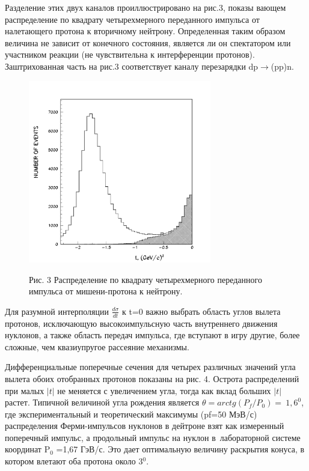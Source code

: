 \documentclass[a4paper,12pt]{article}
\begin{document}
{{        \vspace {10mm}
        Разделение этих двух каналов проиллюстрировано на рис.3, показы\-
        вающем распределение по квадрату четырехмерного переданного
        импуль\-са от налетающего протона к вторичному нейтрону.
        Определенная таким образом величина не зависит от конечного
        состояния, является ли он спектатором или участником реакции
        (не чувствительна к интерференции протонов). Заштрихованная часть
        на рис.3 соответствует каналу переза\-рядки dp$\to$(pp)n.

        \begin{figure}[hbt]
          \begin{center}
            \includegraphics[width=8cm]{dist.pdf}
          \end{center}
          \vspace{0.4mm}
          Рис. 3 Распределение по квадрату четырехмерного переданного
          импульса от мишени-протона к нейтрону.
        \end{figure}

        Для разумной интерполяции $\frac{d\sigma}{dt}$ к t=0
        важно выбрать область углов вылета протонов,
        исключающую высокоимпульсную часть внутреннего
        движения нуклонов, а также область передач импульса, где вступают
        в игру другие, более сложные, чем квазиупругое рассеяние механизмы.

        Дифференциальные поперечные сечения для четырех различных
        значе\-ний угла вылета обоих отобранных протонов показаны
        на рис. 4. Острота распределений при малых $\vert t\vert$
        не меняется с увеличением угла, тогда как вклад больших
        $\vert t\vert$ растет. Типичной величиной угла рождения является
        $\theta=arctg(P_f/P_0)=~1,6^0$, где экспериментальный
        и теоретический максимумы (pf=50 МэВ/с) распределения
        Ферми-импульсов нуклонов в дейтроне взят как измеренный поперечный
        импульс, а продольный импульс на нуклон в~лабораторной системе
        координат P$_0$ =1,67 ГэВ/с. Это дает оптимальную величину
        раскрытия конуса, в котором влетают оба протона около 3$^0$.

}}
\end{document}

